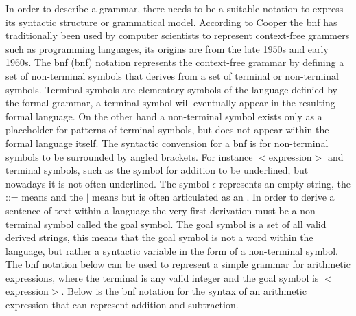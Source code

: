 In order to describe a grammar, there needs to be a suitable notation to express its syntactic structure or grammatical model. According to Cooper the \acrshort{bnf} has traditionally been used by computer scientists to represent context-free grammers such as programming languages, its origins are from the late 1950s and early 1960s. The \acrlong{bnf} (\acrshort{bnf}) notation represents the context-free grammar by defining a set of non-terminal symbols that derives from a set of terminal or non-terminal symbols. Terminal symbols are elementary symbols of the language definied by the formal grammar, a terminal symbol will eventually appear in the resulting formal language. On the other hand a non-terminal symbol exists only as a placeholder for patterns of terminal symbols, but does not appear within the formal language itself. The syntactic convension for a \acrshort{bnf} is for non-terminal symbols to be surrounded by angled brackets. For instance $<$expression$>$ and terminal symbols, such as the symbol for addition \say{+} to be underlined, but nowadays it is not often underlined. The symbol $\epsilon$ represents an empty string, the ::= means  and the $\mid$ means  but is often articulated as an  \cite{cooper2011engineering}. In order to derive a sentence of text within a language the very first derivation must be a non-terminal symbol called the goal symbol. The goal symbol is a set of all valid derived strings, this means that the goal symbol is not a word within the language, but rather a syntactic variable in the form of a non-terminal symbol. The \acrshort{bnf} notation below can be used to represent a simple grammar for arithmetic expressions, where the terminal  is any valid integer and the goal symbol is $<$expression$>$. Below is the \acrshort{bnf} notation for the syntax of an arithmetic expression that can represent addition and subtraction.

\noindent
\begin{algorithm}
\begin{bnf*}
		{}\\
		\\
		\\
\end{bnf*}
\end{algorithm}
\FloatBarrier

